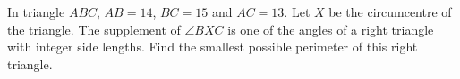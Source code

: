 In triangle $ABC$, $AB=14$, $BC=15$ and $AC=13$. Let $X$ be the circumcentre of the triangle. The supplement of $\angle BXC$ is one of the angles of a right triangle with integer side lengths. Find the smallest possible perimeter of this right triangle.
